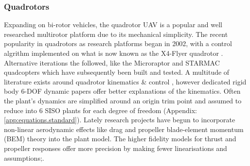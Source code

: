 \subsubsection*{Quadrotors}
Expanding on bi-rotor vehicles, the quadrotor UAV is a popular and well researched multirotor platform due to its mechanical simplicity. The recent popularity in quadrotors as research platforms began in 2002, with a control algrithm implemented on what is now known as the X4-Flyer quadrotor \cite{x4flyer,x4flyercontrol}. Alternative iterations the followed, like the Microraptor\cite{microraptor} and STARMAC\cite{starmac} quadcopters which have subsequently been built and tested. A multitude of literature exists around quadrotor kinematics \& control \cite{dynamicmodelling2013, dynamicmodelling2009, modelingquadcopter, quaddynamics, fullquadcoptercontrol}, however dedicated rigid body 6-DOF dynamic papers \cite{rigidbodylecture,eulerrigidbody} offer better explanations of the kinematics. Often the plant's dynamics are simplified around an origin trim point and assumed to reduce into 6 SISO plants for each degree of freedom (Appendix:\ref{app:equations.standard}). Lately research projects have begun to incorporate non-linear aerodynamic effects like drag and propeller blade-element momentum (BEM) theory into the plant model\cite{lowreynolds,bem,starmac}. The higher fidelity models for thrust and propeller responses offer more precision by making fewer linearisations and assumptions;\cite{nonlineardynamics,starmac}.
\par
